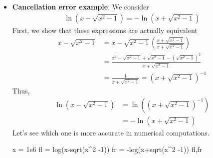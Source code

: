 \documentclass{report}
\begin{document}
\begin{itemize}
        \item \textbf{Cancellation error example}: We consider 
            \begin{align*}
                \ln{\left(x - \sqrt{x^{2} -1}\right)} = -\ln{\left(x + \sqrt{x^{2} - 1}\right)}
            \end{align*}
            First, we show that these expressions are actually equivalent
            \begin{align*}
                x-\sqrt{x^{2} -1} &= x-\sqrt{x^{2} -1} \left(\frac{x+\sqrt{x^{2}-1}}{x+\sqrt{x^{2} - 1}}\right) \\
                                  &= \frac{x^{2} - \sqrt{x^{2}-1} + \sqrt{x^{2} - 1} - \left(\sqrt{x^{2} - 1}\right)^{2}}{x+\sqrt{x^{2}-1}} \\
                                  &= \frac{1}{x+\sqrt{x^{2}-1}} = \left(x+\sqrt{x^{2}-1}\right)^{-1}
            \end{align*}
            Thus, 
            \begin{align*}
                \ln{\left(x-\sqrt{x^{2}-1}\right)} &= \ln{\left(\left(x+\sqrt{x^{2}-1}\right)^{-1}\right)}  \\
                                                   &= - \ln{\left(x+\sqrt{x^{2}-1}\right)}
            \end{align*}
            \bigbreak \noindent 
            Let's see which one is more accurate in numerical computations.
            \bigbreak \noindent 
            \begin{jlcode}
            x = 1e6
            fl = log(x-sqrt(x^2 -1))
            fr = -log(x+sqrt(x^2 -1))
            fl,fr


\end{jlcode}
\end{itemize}
\end{document}
